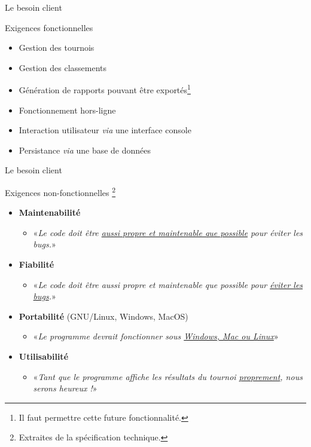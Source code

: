 \begin{frame}{Le besoin client}
  \begin{block}{Exigences fonctionnelles}
    \begin{itemize}
    \item Gestion des tournois
    \item Gestion des classements
    \item Génération de rapports pouvant être exportés\footnote{Il faut permettre cette future fonctionnalité.}
    \item Fonctionnement hors-ligne
    \item Interaction utilisateur \textit{via} une interface console
    \item Persistance \textit{via} une base de données
    \end{itemize}
  \end{block}
\end{frame}

\begin{frame}{Le besoin client}
  \begin{block}{Exigences non-fonctionnelles \footnote{Extraites de la spécification technique.}}
    \begin{itemize}
    \item \textbf{Maintenabilité}
      \begin{itemize}
      \item «\textit{Le code doit être \underline{aussi propre et maintenable que
        possible} pour éviter les bugs.}»
      \end{itemize}
    \item \textbf{Fiabilité}
      \begin{itemize}
      \item «\textit{Le code doit être aussi propre et maintenable que
        possible pour \underline{éviter les bugs}.}»
      \end{itemize}

    \item \textbf{Portabilité} (GNU/Linux, Windows, MacOS)
      \begin{itemize}
      \item «\textit{Le programme devrait fonctionner sous
        \underline{Windows, Mac ou Linux}}»
      \end{itemize}

    \item \textbf{Utilisabilité}
      \begin{itemize}
      \item «\textit{Tant que le programme affiche les résultats du
        tournoi \underline{proprement}, nous serons heureux !}»
      \end{itemize}      
    \end{itemize}
  \end{block}
\end{frame}
